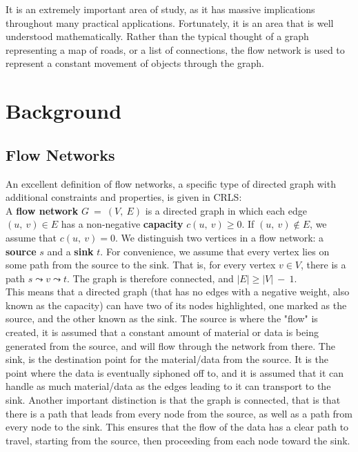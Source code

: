 \documentclass[conference]{IEEEtran}
\begin{document}
It is an extremely important area of study, as it has massive implications throughout many practical applications. Fortunately, it is an area that is well understood mathematically. Rather than the typical thought of a graph representing a map of roads, or a list of connections, the flow network is used to represent a constant movement of objects through the graph. 

\section{Background}
\subsection{Flow Networks}
An excellent definition of flow networks, a specific type of directed graph with additional constraints and properties, is given in CRLS:\\

A \textbf{flow network} $G\ =\ (V,\ E)$ is a directed graph in which each edge $(u,\ v) \in E$ has a non-negative \textbf{capacity} $c(u,\ v) \geq 0$. If $(u,\ v) \notin E$, we assume that $c(u,\ v) = 0$. We distinguish two vertices in a flow network: a \textbf{source} $s$ and a \textbf{sink} $t$. For convenience, we assume that every vertex lies on some path from the source to the sink. That is, for every vertex $v \in V$, there is a path $s \leadsto v \leadsto t$. The graph is therefore connected, and $|E| \geq |V|\ -\ 1$.\cite{CLRS:2001}\\

This means that a directed graph (that has no edges with a negative weight, also known as the capacity) can have two of its nodes highlighted, one marked as the source, and the other known as the sink. The source is where the "flow" is created, it is assumed that a constant amount of material or data is being generated from the source, and will flow through the network from there. The sink, is the destination point for the material/data from the source. It is the point where the data is eventually siphoned off to, and it is assumed that it can handle as much material/data as the edges leading to it can transport to the sink. Another important distinction is that the graph is connected, that is that there is a path that leads from every node from the source, as well as a path from every node to the sink. This ensures that the flow of the data has a clear path to travel, starting from the source, then proceeding from each node toward the sink.
\end{document}
